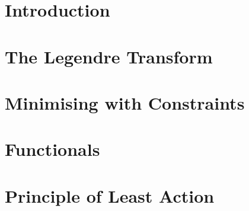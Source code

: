 \documentclass[british,11pt,a4paper]{report}
\begin{document}
\maketitle
\tableofcontents
\chapter{Introduction}

\chapter{The Legendre Transform}

\chapter{Minimising with Constraints}

\chapter{Functionals}

\chapter{Principle of Least Action}

\end{document}
